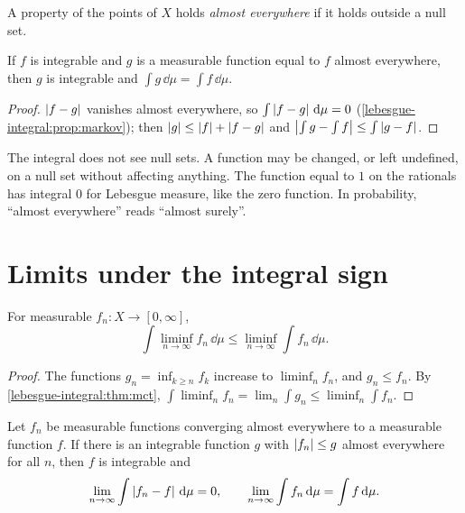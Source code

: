 \begin{notechapter}
\begin{definition}\label{lebesgue-integral:def:ae}
A property of the points of $X$ holds \emph{almost everywhere} if it
holds outside a null set.
\end{definition}

\begin{proposition}\label{lebesgue-integral:prop:ae}
If $f$ is integrable and $g$ is a measurable function equal to $f$
almost everywhere, then $g$ is integrable and
$\int g\,\dd\mu = \int f\,\dd\mu$.
\end{proposition}

\begin{proof}
$\left|f - g\right|$ vanishes almost everywhere, so
$\int\left|f - g\right|\,\mathrm{d}\mu = 0$
(\cref{lebesgue-integral:prop:markov}); then
$\left|g\right|\leq\left|f\right| + \left|f - g\right|$ and
$\left|\int g - \int f\right|\leq\int\left|g - f\right|$.
\end{proof}

\begin{keyidea}
The integral does not see null sets. A function may be changed, or left
undefined, on a null set without affecting anything. The function equal
to $1$ on the rationals has integral $0$ for Lebesgue measure, like the
zero function. In probability, ``almost everywhere'' reads ``almost
surely''.
\end{keyidea}

\section{Limits under the integral sign}\label{lebesgue-integral:sec:limits}

\begin{theorem}\label{lebesgue-integral:thm:fatou}
For measurable $f_n:X\to[0, \infty]$,
\[
  \int\liminf_{n\to\infty}f_n\,\dd\mu
  \leq\liminf_{n\to\infty}\int f_n\,\dd\mu .
\]
\end{theorem}

\begin{proof}
The functions $g_n = \inf_{k\geq n}f_k$ increase to $\liminf_nf_n$, and
$g_n\leq f_n$. By \cref{lebesgue-integral:thm:mct},
$\int\liminf_nf_n = \lim_n\int g_n\leq\liminf_n\int f_n$.
\end{proof}

\begin{theorem}\label{lebesgue-integral:thm:dct}
Let $f_n$ be measurable functions converging almost everywhere to a
measurable function $f$. If there is an integrable function $g$ with
$\left|f_n\right|\leq g$ almost everywhere for all $n$, then $f$ is integrable
and
\[
  \lim_{n\to\infty}\int\left|f_n - f\right|\,\mathrm{d}\mu = 0 , \qquad
  \lim_{n\to\infty}\int f_n\,\mathrm{d}\mu = \int f\,\mathrm{d}\mu .
\]
\end{theorem}


\end{notechapter}
